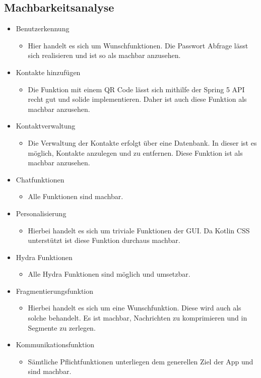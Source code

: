 \subsection{Machbarkeitsanalyse}

\begin{itemize}
	\item Benutzerkennung
		\begin{itemize}
			\item Hier handelt es sich um Wunschfunktionen. Die Passwort Abfrage lässt sich realisieren und ist so als machbar anzusehen.
		\end{itemize}
	
	\item Kontakte hinzufügen
		\begin{itemize}
			\item Die Funktion mit einem QR Code lässt sich mithilfe der Spring 5 API recht gut und solide implementieren. Daher ist auch diese Funktion als machbar anzusehen.
		\end{itemize}
	
	\item Kontaktverwaltung
		\begin{itemize}
			\item Die Verwaltung der Kontakte erfolgt über eine Datenbank. In dieser ist es möglich, Kontakte anzulegen und zu entfernen. Diese Funktion ist als machbar anzusehen.
		\end{itemize}
	
	\item Chatfunktionen
	 \begin{itemize}
		\item Alle Funktionen sind machbar. 
	\end{itemize}
	
	\item Personalisierung
	\begin{itemize}
		\item Hierbei handelt es sich um triviale Funktionen der GUI. Da Kotlin CSS unterstützt ist diese Funktion durchaus machbar.
	\end{itemize}
	
	\item Hydra Funktionen
	\begin{itemize}
		\item Alle Hydra Funktionen sind möglich und umsetzbar. 
	\end{itemize}
	
	\item Fragmentierungsfunktion
	\begin{itemize}
		\item Hierbei handelt es sich um eine Wunschfunktion. Diese wird auch als solche behandelt. Es ist machbar, Nachrichten zu komprimieren und in Segmente zu zerlegen.
	\end{itemize} 

	\item Kommunikationsfunktion
	\begin{itemize}
		\item Sämtliche Pflichtfunktionen unterliegen dem generellen Ziel der App und sind machbar.
	\end{itemize}



\end{itemize}

